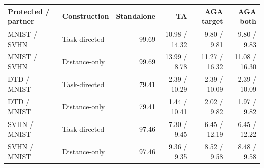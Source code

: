 \begin{tabular}{llrrrr}
\toprule
Protected / partner & Construction & Standalone & TA & AGA target & AGA both \\
\midrule
MNIST / SVHN & Task-directed & 99.69 & 10.98 / 14.32 & 9.80 / 9.81 & 9.80 / 9.83 \\
MNIST / SVHN & Distance-only & 99.69 & 13.99 / 8.78 & 11.27 / 16.32 & 11.08 / 16.30 \\
DTD / MNIST & Task-directed & 79.41 & 2.39 / 10.29 & 2.39 / 10.09 & 2.39 / 10.09 \\
DTD / MNIST & Distance-only & 79.41 & 1.44 / 10.41 & 2.02 / 9.82 & 1.97 / 9.82 \\
SVHN / MNIST & Task-directed & 97.46 & 7.30 / 9.45 & 6.45 / 12.19 & 6.45 / 12.22 \\
SVHN / MNIST & Distance-only & 97.46 & 9.36 / 9.35 & 8.52 / 9.58 & 8.48 / 9.58 \\
\bottomrule
\end{tabular}
